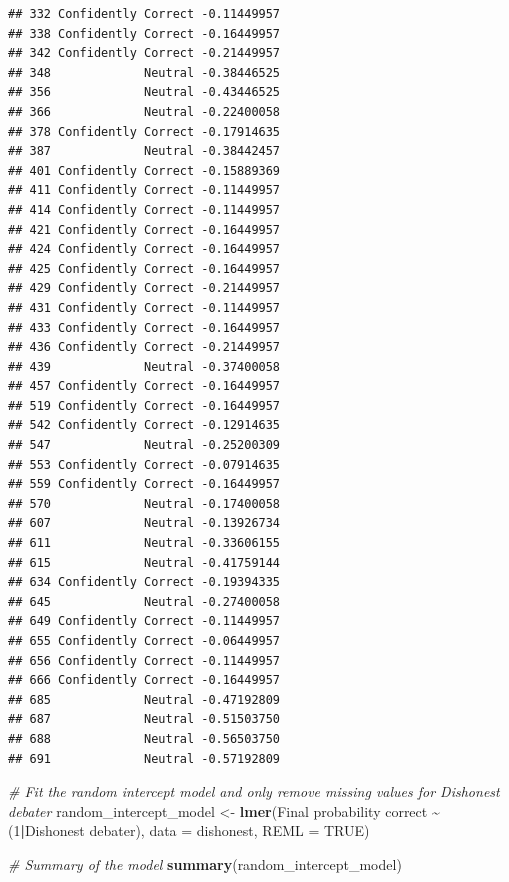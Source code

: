 \documentclass[
]{article}
\newenvironment{Shaded}{\begin{snugshade}}{\end{snugshade}}
\newcommand{\AttributeTok}[1]{\textcolor[rgb]{0.13,0.29,0.53}{#1}}
\newcommand{\CommentTok}[1]{\textcolor[rgb]{0.56,0.35,0.01}{\textit{#1}}}
\newcommand{\ConstantTok}[1]{\textcolor[rgb]{0.56,0.35,0.01}{#1}}
\newcommand{\DecValTok}[1]{\textcolor[rgb]{0.00,0.00,0.81}{#1}}
\newcommand{\FunctionTok}[1]{\textcolor[rgb]{0.13,0.29,0.53}{\textbf{#1}}}
\newcommand{\NormalTok}[1]{#1}
\newcommand{\OtherTok}[1]{\textcolor[rgb]{0.56,0.35,0.01}{#1}}
\newcommand{\SpecialCharTok}[1]{\textcolor[rgb]{0.81,0.36,0.00}{\textbf{#1}}}
\newcommand{\StringTok}[1]{\textcolor[rgb]{0.31,0.60,0.02}{#1}}
\begin{document}
\begin{verbatim}
## 332 Confidently Correct -0.11449957
## 338 Confidently Correct -0.16449957
## 342 Confidently Correct -0.21449957
## 348             Neutral -0.38446525
## 356             Neutral -0.43446525
## 366             Neutral -0.22400058
## 378 Confidently Correct -0.17914635
## 387             Neutral -0.38442457
## 401 Confidently Correct -0.15889369
## 411 Confidently Correct -0.11449957
## 414 Confidently Correct -0.11449957
## 421 Confidently Correct -0.16449957
## 424 Confidently Correct -0.16449957
## 425 Confidently Correct -0.16449957
## 429 Confidently Correct -0.21449957
## 431 Confidently Correct -0.11449957
## 433 Confidently Correct -0.16449957
## 436 Confidently Correct -0.21449957
## 439             Neutral -0.37400058
## 457 Confidently Correct -0.16449957
## 519 Confidently Correct -0.16449957
## 542 Confidently Correct -0.12914635
## 547             Neutral -0.25200309
## 553 Confidently Correct -0.07914635
## 559 Confidently Correct -0.16449957
## 570             Neutral -0.17400058
## 607             Neutral -0.13926734
## 611             Neutral -0.33606155
## 615             Neutral -0.41759144
## 634 Confidently Correct -0.19394335
## 645             Neutral -0.27400058
## 649 Confidently Correct -0.11449957
## 655 Confidently Correct -0.06449957
## 656 Confidently Correct -0.11449957
## 666 Confidently Correct -0.16449957
## 685             Neutral -0.47192809
## 687             Neutral -0.51503750
## 688             Neutral -0.56503750
## 691             Neutral -0.57192809
\end{verbatim}

\begin{Shaded}
\begin{Highlighting}[]
\CommentTok{\# Fit the random intercept model and only remove missing values for \textquotesingle{}Dishonest debater\textquotesingle{}}
\NormalTok{random\_intercept\_model }\OtherTok{\textless{}{-}} \FunctionTok{lmer}\NormalTok{(}\StringTok{\textasciigrave{}}\AttributeTok{Final probability correct}\StringTok{\textasciigrave{}} \SpecialCharTok{\textasciitilde{}}\NormalTok{ (}\DecValTok{1}\SpecialCharTok{|}\StringTok{\textasciigrave{}}\AttributeTok{Dishonest debater}\StringTok{\textasciigrave{}}\NormalTok{), }
                                \AttributeTok{data =}\NormalTok{ dishonest, }
                                \AttributeTok{REML =} \ConstantTok{TRUE}\NormalTok{)}

\CommentTok{\# Summary of the model}
\FunctionTok{summary}\NormalTok{(random\_intercept\_model)}
\end{Highlighting}
\end{Shaded}
\end{document}
